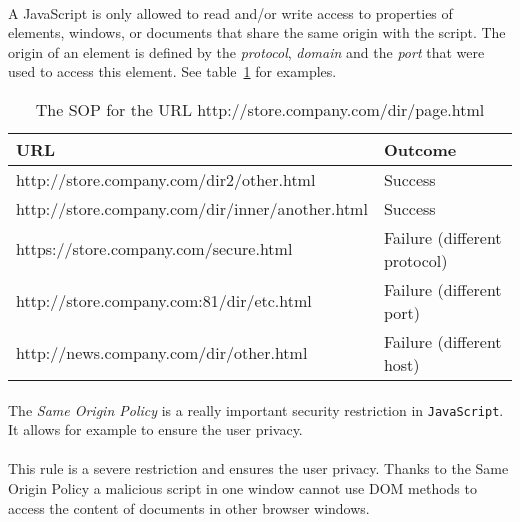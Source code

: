 \paragraph{}
    A JavaScript is only allowed to read and/or write access to properties of elements, windows, or documents that share the same origin with the script. The origin of an element is defined by the \emph{protocol}, \emph{domain} and the \emph{port} that were used to access this element. See table~\ref{SOP} for examples. %
\begin{table}[h!]
\begin{tabular}{|l|l|}
      \hline
      URL & Outcome\\
      \hline\hline
    http://store.company.com/dir2/other.html        & Success \\
    http://store.company.com/dir/inner/another.html & Success \\
    https://store.company.com/secure.html           & Failure (different protocol) \\
    http://store.company.com:81/dir/etc.html        & Failure (different port) \\
    http://news.company.com/dir/other.html          & Failure (different host) \\      
      \hline
\end{tabular}
\caption{The SOP for the URL http://store.company.com/dir/page.html}\label{SOP}
\end{table}

\paragraph{}
The \emph{Same Origin Policy} is a really important security restriction in \texttt{JavaScript}. It allows for example to ensure the user privacy. %

\paragraph{}
This rule is a severe restriction and ensures the user privacy. Thanks to the Same Origin Policy a malicious script in one window cannot use DOM methods to access the content of documents in other browser windows. %

